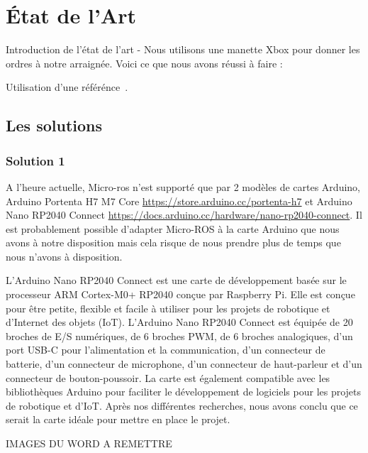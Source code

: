 	\chapter{État de l'Art}
	\thispagestyle{empty}
	
Introduction de l'état de l'art - Nous utilisons une manette Xbox pour donner les ordres à notre arraignée.
Voici ce que nous avons réussi à faire :

Utilisation d'une référénce~\cite{NOM00}.

		\section{Les solutions}

			\subsection{Solution 1}

A l’heure actuelle, Micro-ros n’est supporté que par 2 modèles de cartes Arduino, Arduino Portenta H7 M7 Core
\url{https://store.arduino.cc/portenta-h7} et Arduino Nano RP2040 Connect \url{https://docs.arduino.cc/hardware/nano-rp2040-connect}. 
Il est probablement possible d’adapter Micro-ROS à la carte Arduino que nous avons à notre disposition mais cela risque de nous 
prendre plus de temps que nous n’avons à disposition.  
\linebreak
	
L'Arduino Nano RP2040 Connect est une carte de développement basée sur le processeur ARM Cortex-M0+ RP2040 conçue par Raspberry Pi. 
Elle est conçue pour être petite, flexible et facile à utiliser pour les projets de robotique et d'Internet des objets (IoT). 
L'Arduino Nano RP2040 Connect est équipée de 20 broches de E/S numériques, de 6 broches PWM, de 6 broches analogiques, 
d'un port USB-C pour l'alimentation et la communication, d'un connecteur de batterie, d'un connecteur de microphone, 
d'un connecteur de haut-parleur et d'un connecteur de bouton-poussoir. La carte est également compatible avec les bibliothèques Arduino 
pour faciliter le développement de logiciels pour les projets de robotique et d'IoT. 
Après nos différentes recherches, nous avons conclu que ce serait la carte idéale pour mettre en place le projet. 
\linebreak 

IMAGES DU WORD A REMETTRE

